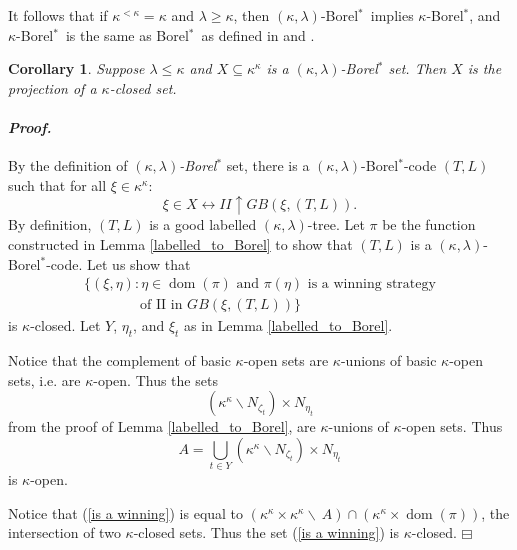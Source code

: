 \documentclass[12pt,a4paper]{amsart}
\newtheorem{cor}[thm]{Corollary}
\theoremstyle{definition}
\theoremstyle{remark}
\DeclareMathOperator{\dom}{dom}
\newenvironment{cproof}{\paragraph{\emph{Proof.\,}}}{\hfill{$\boxminus$}\par\vspace{2mm}}
\def\borelstar{Borel\nobreak\hspace{1pt}$^*$}
\begin{document}
It follows that if $\kappa^{<\kappa}=\kappa$ and $\lambda\ge\kappa$, then $(\kappa,\lambda)$-\borelstar\ implies $\kappa$-\borelstar, and $\kappa$-\borelstar\ is the same as \borelstar\ as defined in \cite{MR3235820} and \cite{MR1242054}.  

\begin{cor}\label{Borel*_proj_closed}
    Suppose $\lambda\leq\kappa$ and $X\subseteq \kappa^\kappa$ is a \emph{$(\kappa,\lambda)$-\borelstar} set. Then $X$ is the projection of a $\kappa$-closed set. 
\end{cor}
\begin{cproof}
By the definition of \emph{$(\kappa,\lambda)$-\borelstar} set, there is a $(\kappa,\lambda)$-\borelstar-code $(T,L)$ such that for all $\xi\in\kappa^\kappa$: 
$$\xi\in X\leftrightarrow II\uparrow GB(\xi,(T,L)).$$
By definition, $(T,L)$ is a good labelled $(\kappa,\lambda)$-tree.
Let $\pi$ be the function constructed in Lemma \ref{labelled_to_Borel} to show that $(T,L)$ is a $(\kappa,\lambda)$-\borelstar-code. Let us show that \begin{equation}\label{is a winning}
    \begin{array}{l}
 \{(\xi,\eta) : \eta\in\dom(\pi)\text{ and }\pi(\eta)\mbox{ is a winning strategy}\\ \qquad\qquad\text{of II in }GB(\xi,(T,L))\}\end{array}\end{equation} is $\kappa$-closed. Let $Y$, $\eta_t$, and $\xi_t$ as in Lemma \ref{labelled_to_Borel}.

    Notice that the complement of basic $\kappa$-open sets are $\kappa$-unions of basic $\kappa$-open sets, i.e. are $\kappa$-open. Thus the sets $$(\kappa^\kappa\backslash N_{\zeta_t})\times N_{\eta_t}$$ from the proof of Lemma \ref{labelled_to_Borel}, are $\kappa$-unions of $\kappa$-open sets. Thus $$A=\bigcup_{t\in Y}(\kappa^\kappa\backslash N_{\zeta_t})\times N_{\eta_t}$$ is $\kappa$-open.

    Notice that (\ref{is a winning}) 
    is equal to $(\kappa^\kappa\times\kappa^\kappa\backslash\ A)\cap \left(\kappa^\kappa\times \dom(\pi)\right)$, the intersection of two $\kappa$-closed sets. Thus the set (\ref{is a winning})
    is $\kappa$-closed.
\end{cproof}
\end{document}
